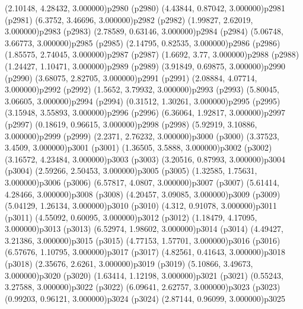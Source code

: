 \psPoint(2.10148, 4.28432, 3.000000){p2980}
\psdot(p2980)
\psPoint(4.43844, 0.87042, 3.000000){p2981}
\psdot(p2981)
\psPoint(6.3752, 3.46696, 3.000000){p2982}
\psdot(p2982)
\psPoint(1.99827, 2.62019, 3.000000){p2983}
\psdot(p2983)
\psPoint(2.78589, 0.63146, 3.000000){p2984}
\psdot(p2984)
\psPoint(5.06748, 3.66773, 3.000000){p2985}
\psdot(p2985)
\psPoint(2.14795, 0.82535, 3.000000){p2986}
\psdot(p2986)
\psPoint(1.85575, 2.74045, 3.000000){p2987}
\psdot(p2987)
\psPoint(1.6692, 3.77, 3.000000){p2988}
\psdot(p2988)
\psPoint(1.24427, 1.10471, 3.000000){p2989}
\psdot(p2989)
\psPoint(3.91849, 0.69875, 3.000000){p2990}
\psdot(p2990)
\psPoint(3.68075, 2.82705, 3.000000){p2991}
\psdot(p2991)
\psPoint(2.08884, 4.07714, 3.000000){p2992}
\psdot(p2992)
\psPoint(1.5652, 3.79932, 3.000000){p2993}
\psdot(p2993)
\psPoint(5.80045, 3.06605, 3.000000){p2994}
\psdot(p2994)
\psPoint(0.31512, 1.30261, 3.000000){p2995}
\psdot(p2995)
\psPoint(3.15948, 3.55893, 3.000000){p2996}
\psdot(p2996)
\psPoint(6.36064, 1.92817, 3.000000){p2997}
\psdot(p2997)
\psPoint(0.18619, 0.96615, 3.000000){p2998}
\psdot(p2998)
\psPoint(5.92919, 3.10886, 3.000000){p2999}
\psdot(p2999)
\psPoint(2.2371, 2.76232, 3.000000){p3000}
\psdot(p3000)
\psPoint(3.37523, 3.4509, 3.000000){p3001}
\psdot(p3001)
\psPoint(1.36505, 3.5888, 3.000000){p3002}
\psdot(p3002)
\psPoint(3.16572, 4.23484, 3.000000){p3003}
\psdot(p3003)
\psPoint(3.20516, 0.87993, 3.000000){p3004}
\psdot(p3004)
\psPoint(2.59266, 2.50453, 3.000000){p3005}
\psdot(p3005)
\psPoint(1.32585, 1.75631, 3.000000){p3006}
\psdot(p3006)
\psPoint(6.57817, 4.0807, 3.000000){p3007}
\psdot(p3007)
\psPoint(5.61414, 4.28466, 3.000000){p3008}
\psdot(p3008)
\psPoint(4.20457, 3.09085, 3.000000){p3009}
\psdot(p3009)
\psPoint(5.04129, 1.26134, 3.000000){p3010}
\psdot(p3010)
\psPoint(4.312, 0.91078, 3.000000){p3011}
\psdot(p3011)
\psPoint(4.55092, 0.60095, 3.000000){p3012}
\psdot(p3012)
\psPoint(1.18479, 4.17095, 3.000000){p3013}
\psdot(p3013)
\psPoint(6.52974, 1.98602, 3.000000){p3014}
\psdot(p3014)
\psPoint(4.49427, 3.21386, 3.000000){p3015}
\psdot(p3015)
\psPoint(4.77153, 1.57701, 3.000000){p3016}
\psdot(p3016)
\psPoint(6.57676, 1.10795, 3.000000){p3017}
\psdot(p3017)
\psPoint(4.82561, 0.41643, 3.000000){p3018}
\psdot(p3018)
\psPoint(2.35676, 2.6261, 3.000000){p3019}
\psdot(p3019)
\psPoint(5.10866, 3.49673, 3.000000){p3020}
\psdot(p3020)
\psPoint(1.63414, 1.12198, 3.000000){p3021}
\psdot(p3021)
\psPoint(0.55243, 3.27588, 3.000000){p3022}
\psdot(p3022)
\psPoint(6.09641, 2.62757, 3.000000){p3023}
\psdot(p3023)
\psPoint(0.99203, 0.96121, 3.000000){p3024}
\psdot(p3024)
\psPoint(2.87144, 0.96099, 3.000000){p3025}
